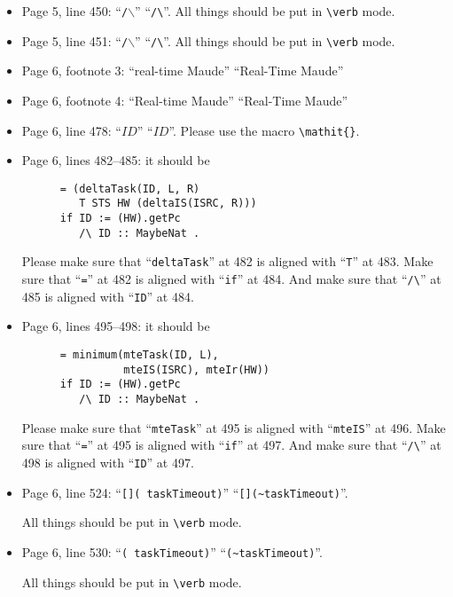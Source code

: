 \documentclass[12pt,onecolumn]{IEEEtranTIE}
\begin{document}
\begin{itemize}
\item Page 5, line 450: ``\verb|/|$\backslash$'' \by
  ``\verb|/\|''. All things should be put in \verb|\verb| mode.

\item Page 5, line 451: ``\verb|/|$\backslash$'' \by
  ``\verb|/\|''. All things should be put in \verb|\verb| mode.

\item Page 6, footnote 3: ``real-time Maude'' \by ``Real-Time Maude''

\item Page 6, footnote 4: ``Real-time Maude'' \by ``Real-Time Maude''  

\item Page 6, line 478: ``$ID$'' \by ``$\mathit{ID}$''. Please use the
  macro \verb|\mathit{}|.


\item Page 6, lines 482--485: it should be
\begin{verbatim}
      = (deltaTask(ID, L, R) 
         T STS HW (deltaIS(ISRC, R)))
      if ID := (HW).getPc 
         /\ ID :: MaybeNat .
\end{verbatim}

Please make sure that ``\verb|deltaTask|'' at 482 is aligned with
``\verb|T|'' at 483. Make sure that ``\verb|=|'' at 482 is aligned
with ``\verb|if|'' at 484. And make sure that ``\verb|/\|'' at 485 is
aligned with ``\verb|ID|'' at 484.


\item Page 6, lines 495--498: it should be
\begin{verbatim}
      = minimum(mteTask(ID, L),
                mteIS(ISRC), mteIr(HW))
      if ID := (HW).getPc 
         /\ ID :: MaybeNat .
\end{verbatim}

Please make sure that ``\verb|mteTask|'' at 495 is aligned with
``\verb|mteIS|'' at 496. Make sure that ``\verb|=|'' at 495 is aligned
with ``\verb|if|'' at 497. And make sure that ``\verb|/\|'' at 498 is
aligned with ``\verb|ID|'' at 497.

\item Page 6, line 524: ``\verb|[]( taskTimeout)|'' \by
  ``\verb|[](~taskTimeout)|''.

All things should be put in \verb|\verb| mode.

\item Page 6, line 530: ``\verb|( taskTimeout)|'' \by
  ``\verb|(~taskTimeout)|''.

All things should be put in \verb|\verb| mode.  



\end{itemize}
\end{document}
